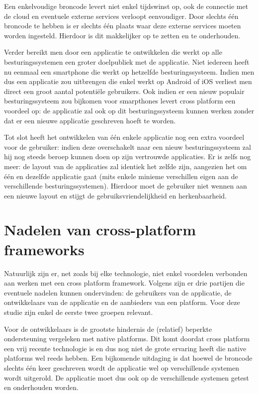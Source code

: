 Een enkelvoudige broncode levert niet enkel tijdswinst op, ook de connectie met de cloud en eventuele externe services verloopt eenvoudiger. Door slechts één broncode te hebben is er slechts één plaats waar deze externe services moeten worden ingesteld. Hierdoor is dit makkelijker op te zetten en te onderhouden.

Verder bereikt men door een applicatie te ontwikkelen die werkt op alle besturingssystemen een groter doelpubliek met de applicatie. Niet iedereen heeft nu eenmaal een smartphone die werkt op hetzelfde besturingssysteem. Indien men dus een applicatie zou uitbrengen die enkel werkt op Android of iOS verliest men direct een groot aantal potentiële gebruikers. Ook indien er een nieuw populair besturingssysteem zou bijkomen voor smarpthones levert cross platform een voordeel op: de applicatie zal ook op dit besturingssysteem kunnen werken zonder dat er een nieuwe applicatie geschreven hoeft te worden.

Tot slot heeft het ontwikkelen van één enkele applicatie nog een extra voordeel voor de gebruiker: indien deze overschakelt naar een nieuw besturingssysteem zal hij nog steeds beroep kunnen doen op zijn vertrouwde applicaties. Er is zelfs nog meer: de layout van de applicaties zal identiek het zelfde zijn, aangezien het om één en dezelfde applicatie gaat (mits enkele minieme verschillen eigen aan de verschillende besturingssystemen). Hierdoor moet de gebruiker niet wennen aan een nieuwe layout en stijgt de gebruiksvriendelijkheid en herkenbaarheid.

\section{Nadelen van cross-platform frameworks}

Natuurlijk zijn er, net zoals bij elke technologie, niet enkel voordelen verbonden aan werken met een cross platform framework. Volgens \textcite{Corral2012} zijn er drie partijen die eventuele nadelen kunnen ondervinden: de gebruikers van de applicatie, de ontwikkelaars van de applicatie en de aanbieders van een platform. Voor deze studie zijn enkel de eerste twee groepen relevant.

Voor de ontwikkelaars is de grootste hindernis de (relatief) beperkte ondersteuning vergeleken met native platforms. Dit komt doordat cross platform een vrij recente technologie is en dus nog niet de grote ervaring heeft die native platforms wel reeds hebben. Een bijkomende uitdaging is dat hoewel de broncode slechts één keer geschreven wordt de applicatie wel op verschillende systemen wordt uitgerold. De applicatie moet dus ook op de verschillende systemen getest en onderhouden worden.

